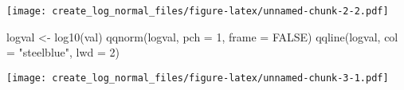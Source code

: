 \documentclass[
]{article}
\newenvironment{Shaded}{\begin{snugshade}}{\end{snugshade}}
\newcommand{\AttributeTok}[1]{\textcolor[rgb]{0.77,0.63,0.00}{#1}}
\newcommand{\ConstantTok}[1]{\textcolor[rgb]{0.00,0.00,0.00}{#1}}
\newcommand{\DecValTok}[1]{\textcolor[rgb]{0.00,0.00,0.81}{#1}}
\newcommand{\FunctionTok}[1]{\textcolor[rgb]{0.00,0.00,0.00}{#1}}
\newcommand{\NormalTok}[1]{#1}
\newcommand{\OtherTok}[1]{\textcolor[rgb]{0.56,0.35,0.01}{#1}}
\newcommand{\StringTok}[1]{\textcolor[rgb]{0.31,0.60,0.02}{#1}}
\begin{document}
\texttt{[image: create\_log\_normal\_files/figure-latex/unnamed-chunk-2-2.pdf]}

\begin{Shaded}
\begin{Highlighting}[]
\NormalTok{logval }\OtherTok{\textless{}{-}} \FunctionTok{log10}\NormalTok{(val)}
\FunctionTok{qqnorm}\NormalTok{(logval, }\AttributeTok{pch =} \DecValTok{1}\NormalTok{, }\AttributeTok{frame =} \ConstantTok{FALSE}\NormalTok{)}
\FunctionTok{qqline}\NormalTok{(logval, }\AttributeTok{col =} \StringTok{"steelblue"}\NormalTok{, }\AttributeTok{lwd =} \DecValTok{2}\NormalTok{)}
\end{Highlighting}
\end{Shaded}

\texttt{[image: create\_log\_normal\_files/figure-latex/unnamed-chunk-3-1.pdf]}
\end{document}
